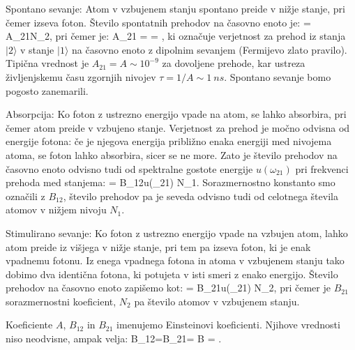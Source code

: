 Spontano sevanje: Atom v vzbujenem stanju spontano preide v nižje stanje, pri čemer izseva
foton. Število spontatnih prehodov na časovno enoto je:
\beq
{} = A_{21}N_2,
\eeq
pri čemer je:
\beq
A_{21} =  = 
,
\eeq
ki označuje verjetnost za prehod iz stanja $|2\rangle$ v stanje $|1\rangle$ na časovno enoto
z dipolnim sevanjem (Fermijevo zlato pravilo). Tipična vrednost je $A_{21}  = A \sim 10^{-9}$ za 
dovoljene prehode, kar ustreza življenjskemu času zgornjih nivojev $\tau = 1/A \sim 1~\si{ns}$. 
Spontano sevanje bomo pogosto zanemarili. 

Absorpcija: Ko foton z ustrezno energijo vpade na atom, se lahko absorbira, pri čemer atom 
preide v vzbujeno stanje. Verjetnost za prehod je močno odvisna od energije fotona: če je 
njegova energija približno enaka energiji med nivojema atoma, se foton lahko absorbira, sicer
se ne more. Zato je število prehodov na časovno enoto odvisno tudi od spektralne gostote 
energije $u(\omega_{21})$ pri frekvenci prehoda med stanjema:
\beq
{} = B_{12}u(\omega_{21}) N_1.
\eeq
Sorazmernostno konstanto smo označili z $B_{12}$, število prehodov pa je seveda odvisno
tudi od celotnega števila atomov v nižjem nivoju $N_1$.

Stimulirano sevanje: Ko foton z ustrezno energijo vpade na vzbujen atom, lahko atom preide
iz višjega v nižje stanje, pri tem pa izseva foton, ki je enak vpadnemu fotonu. Iz enega 
vpadnega fotona in atoma v vzbujenem stanju tako dobimo dva identična fotona, ki potujeta v isti smeri
z enako energijo. Število prehodov na časovno enoto zapišemo kot:
\beq
{} = B_{21}u(\omega_{21}) N_2,
\eeq
pri čemer je $B_{21}$ sorazmernostni koeficient, $N_2$ pa število atomov v vzbujenem stanju. 

Koeficiente $A$, $B_{12}$ in $B_{21}$ imenujemo Einsteinovi koeficienti. Njihove vrednosti 
niso neodvisne, ampak velja:
\beq
B_{12}=B_{21}= B \qquad {} \qquad {} = .
\eeq

